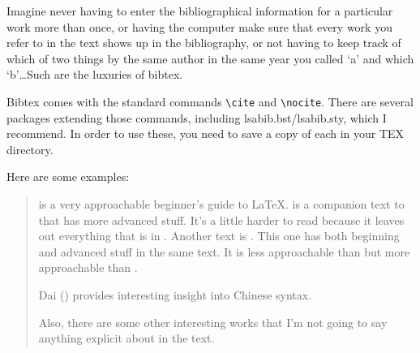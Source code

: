 Imagine never having to enter the bibliographical information for
a particular work more than once, or having the computer make sure
that every work you refer to in the text shows up in the bibliography,
or not having to keep track of which of two things by the same
author in the same year you called `a' and which `b'\ldots  Such
are the luxuries of bibtex.

Bibtex comes with the standard commands \verb+\cite+ and
\verb+\nocite+.  There are several packages extending those commands,
including lsabib.bst/lsabib.sty, which I recommend.  In order
to use these, you need to save a copy of each in your TEX directory.

Here are some examples:

\begin{quote}
 is a very approachable beginner's guide to
\LaTeX.   is a companion text to
 that has more advanced stuff.  It's a little
harder to read because it leaves out everything that is in
.  Another text is .  This one
has both beginning and advanced stuff in the same text.  It is less
approachable than  but more approachable than
.

Dai (\citeyear{Dai92b,Dai92a}) provides interesting insight into
Chinese syntax.

Also, there are some other interesting works that I'm not going to say
anything explicit about in the text.  \nocite{Choi96}
\end{quote}





